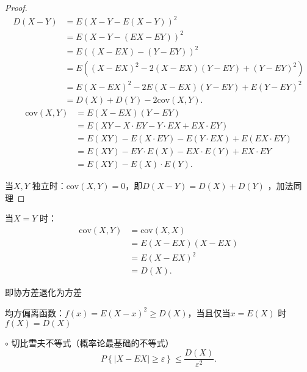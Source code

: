 \begin{proof}
    \begin{align*}
        D\left( X-Y \right) &=E\left( X-Y-E\left( X-Y \right)  \right) ^2\\
        &= E\left( X-Y-\left( EX-EY \right)  \right) ^2 \\
        &= E\left( \left( X-EX \right) -\left( Y-EY \right)  \right) ^2 \\
        &= E\left( \left( X-EX \right) ^2-2\left( X-EX \right) \left( Y-EY \right) +\left( Y-EY \right) ^2 \right)  \\
        &= E\left( X-EX \right) ^2 -2E\left( X-EX \right) \left( Y-EY \right) +E\left( Y-EY \right) ^2\\
        &= D\left( X \right) +D\left( Y \right) -2\text{cov}\left( X,Y \right)
    .\end{align*}
    \begin{align*}
        \text{cov}\left( X,Y \right) &= E\left( X-EX \right) \left( Y-EY \right)\\
        &= E\left( XY-X\cdot EY-Y\cdot EX+EX\cdot EY \right) \\
        &= E\left( XY \right) -E\left( X\cdot EY \right) -E\left( Y\cdot EX \right) +E\left( EX\cdot EY \right)  \\
        &= E\left( XY \right) -EY\cdot E\left( X \right) -EX\cdot E\left( Y \right)+EX\cdot EY  \\
        &= E\left( XY \right) -E\left( X \right) \cdot E\left( Y \right)
    .\end{align*}
    
    当$X,Y$ 独立时：$\text{cov}\left( X,Y \right) =0$，即$D\left( X-Y \right) =D\left( X \right) +D\left( Y \right) $ ，加法同理
\end{proof}
\begin{notation}
    当$X=Y$ 时：
    \begin{align*}
        \text{cov}\left( X,Y \right) &= \text{cov}\left( X,X \right) \\
        &= E\left( X-EX \right) \left( X-EX \right)  \\
        &= E\left( X-EX \right) ^2 \\
        &= D\left( X \right)
    .\end{align*}

    即协方差退化为方差
\end{notation}
\begin{notation}
    均方偏离函数：$f\left( x \right) =E\left( X-x \right) ^2\ge D\left( X \right) $，当且仅当$x=E\left( X \right) $ 时$f\left( X \right) =D\left( X \right) $
\end{notation}
$\circ$ 切比雪夫不等式（概率论最基础的不等式）
\[
    P\left\{ \left| X-EX \right| \ge \varepsilon \right\} \le \frac{D\left( X \right) }{\varepsilon^2}
.\]

